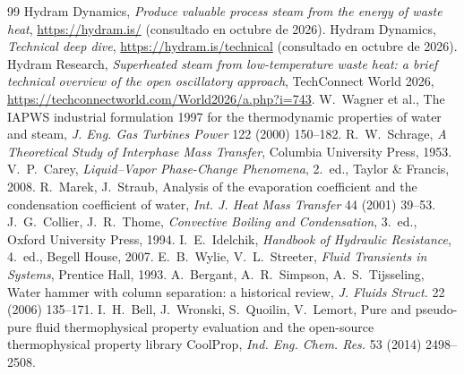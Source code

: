 \documentclass[11pt,a4paper]{article}
\begin{document}
\begin{thebibliography}{99}\small
{} Hydram Dynamics, \emph{Produce valuable process steam from the energy of waste heat}, \url{https://hydram.is/} (consultado en octubre de 2026).
 Hydram Dynamics, \emph{Technical deep dive}, \url{https://hydram.is/technical} (consultado en octubre de 2026).
 Hydram Research, \emph{Superheated steam from low-temperature waste heat: a brief technical overview of the open oscillatory approach}, TechConnect World 2026, \url{https://techconnectworld.com/World2026/a.php?i=743}.
 W.~Wagner et al., The IAPWS industrial formulation 1997 for the thermodynamic properties of water and steam, \emph{J. Eng. Gas Turbines Power} 122 (2000) 150--182.
 R.~W.~Schrage, \emph{A Theoretical Study of Interphase Mass Transfer}, Columbia University Press, 1953.
 V.~P.~Carey, \emph{Liquid--Vapor Phase-Change Phenomena}, 2.\textordfeminine\ ed., Taylor \& Francis, 2008.
 R.~Marek, J.~Straub, Analysis of the evaporation coefficient and the condensation coefficient of water, \emph{Int. J. Heat Mass Transfer} 44 (2001) 39--53.
 J.~G.~Collier, J.~R.~Thome, \emph{Convective Boiling and Condensation}, 3.\textordfeminine\ ed., Oxford University Press, 1994.
 I.~E.~Idelchik, \emph{Handbook of Hydraulic Resistance}, 4.\textordfeminine\ ed., Begell House, 2007.
 E.~B.~Wylie, V.~L.~Streeter, \emph{Fluid Transients in Systems}, Prentice Hall, 1993.
 A.~Bergant, A.~R.~Simpson, A.~S.~Tijsseling, Water hammer with column separation: a historical review, \emph{J. Fluids Struct.} 22 (2006) 135--171.
 I.~H.~Bell, J.~Wronski, S.~Quoilin, V.~Lemort, Pure and pseudo-pure fluid thermophysical property evaluation and the open-source thermophysical property library CoolProp, \emph{Ind. Eng. Chem. Res.} 53 (2014) 2498--2508.
\end{thebibliography}
\end{document}
